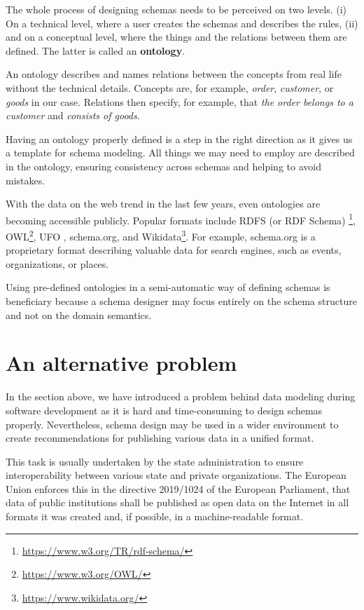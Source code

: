 The whole process of designing schemas needs to be perceived on two levels. (i) On a technical level, where a user creates the schemas and describes the rules, (ii) and on a conceptual level, where the things and the relations between them are defined. The latter is called an \textbf{ontology}.

An ontology describes and names relations between the concepts from real life without the technical details. Concepts are, for example, \textit{order}, \textit{customer}, or \textit{goods} in our case. Relations then specify, for example, that \textit{the order belongs to a customer} and \textit{consists of goods}.

Having an ontology properly defined is a step in the right direction as it gives us a template for schema modeling. All things we may need to employ are described in the ontology, ensuring consistency across schemas and helping to avoid mistakes.

\medskip

With the data on the web \cite{data-on-the-web} trend in the last few years, even ontologies are becoming accessible publicly. Popular formats include RDFS (or RDF Schema) \footnote{\url{https://www.w3.org/TR/rdf-schema/}}, OWL\footnote{\url{https://www.w3.org/OWL/}}, UFO \cite{ufo22}, schema.org, and Wikidata\footnote{\url{https://www.wikidata.org/}}. For example, schema.org is a proprietary format describing valuable data for search engines, such as events, organizations, or places.

Using pre-defined ontologies in a semi-automatic way of defining schemas is beneficiary because a schema designer may focus entirely on the schema structure and not on the domain semantics.

\section*{An alternative problem}

In the section above, we have introduced a problem behind data modeling during software development as it is hard and time-consuming to design schemas properly. Nevertheless, schema design may be used in a wider environment to create recommendations for publishing various data in a unified format.

This task is usually undertaken by the state administration to ensure interoperability between various state and private organizations. The European Union enforces this in the directive 2019/1024 of the European Parliament, that data of public institutions shall be published as open data on the Internet in all formats it was created and, if possible, in a machine-readable format.



